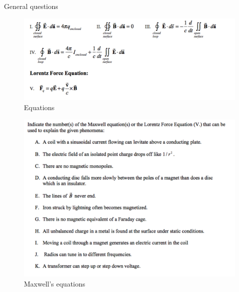 \documentclass[makesolutionspdf]{esg8022pset}
\begin{document}
\begin{problem}{General questions}
\begin{figure}[H]
    \centering
    \includegraphics[width = 15cm]{eqns}
    \caption{Equations}
  \end{figure}
\begin{figure}[H]
    \centering
    \includegraphics[width = 15cm]{max_gen}
    \caption{Maxwell's equations}
  \end{figure}
\end{problem}

\end{document}
